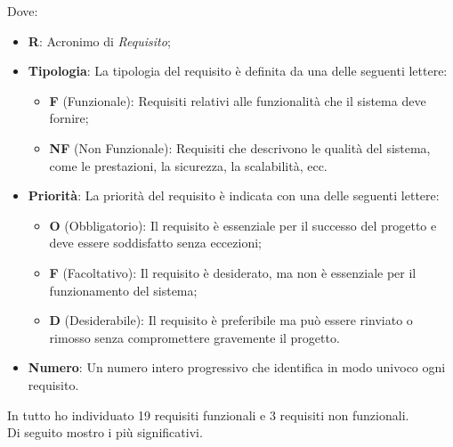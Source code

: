 Dove:
\begin{itemize}
    \item \textbf{R}: Acronimo di \textit{Requisito};
    \item \textbf{Tipologia}: La tipologia del requisito è definita da una delle seguenti lettere:
        \begin{itemize}
            \item \textbf{F} (Funzionale): Requisiti relativi alle funzionalità che il sistema deve fornire;
            \item \textbf{NF} (Non Funzionale): Requisiti che descrivono le qualità del sistema, come le prestazioni, la sicurezza, la scalabilità, ecc.
        \end{itemize}
    \item \textbf{Priorità}: La priorità del requisito è indicata con una delle seguenti lettere:
        \begin{itemize}
            \item \textbf{O} (Obbligatorio): Il requisito è essenziale per il successo del progetto e deve essere soddisfatto senza eccezioni;
            \item \textbf{F} (Facoltativo): Il requisito è desiderato, ma non è essenziale per il funzionamento del sistema;
            \item \textbf{D} (Desiderabile): Il requisito è preferibile ma può essere rinviato o rimosso senza compromettere gravemente il progetto.
        \end{itemize}
    \item \textbf{Numero}: Un numero intero progressivo che identifica in modo univoco ogni requisito.
\end{itemize}

\noindent In tutto ho individuato 19 requisiti funzionali e 3 requisiti non funzionali.\\
Di seguito mostro i più significativi.
